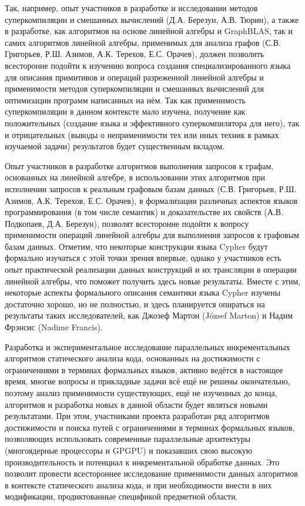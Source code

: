 \documentclass[12pt]{article}  %
\theoremstyle{remark}
\begin{document}
Так, например, опыт участников в разработке и исследовании методов суперкомпиляции и смешанных вычислений (Д.А. Березун, А.В. Тюрин), а также в разработке, как алгоритмов на основе линейной алгебры и GraphBLAS, так и самих алгоритмов линейной алгебры, применимых для анализа графов (С.В. Григорьев, Р.Ш. Азимов, А.К. Терехов, Е.С. Орачев), должен позволить всесторонне подойти к изучению вопроса создания специализированного языка для описания примитивов и операций разреженной линейной алгебры и применимости методов суперкомпиляции и смешанных вычислений для оптимизации программ написанных на нём. Так как применимость суперкомпиляции в данном контексте мало изучена, получение как положительных (создание языка и эффективного суперкомпилятора для него), так и отрицательных (выводы о неприменимости тех или иных техник  в рамках изучаемой задачи) результатов будет существенным вкладом.

Опыт участников в разработке алгоритмов выполнения запросов к графам, основанных на линейной алгебре, в использовании этих алгоритмов при исполнении запросов к реальным графовым базам данных (С.В. Григорьев, Р.Ш. Азимов, А.К. Терехов, Е.С. Орачев), в формализации различных аспектов языков программирования (в том числе семантик) и доказательстве их свойств (А.В. Подкопаев, Д.А. Березун), позволят всесторонне подойти к вопросу применимости операций линейной алгебры для выполнения запросов к графовым базам данных. Отметим, что некоторые конструкции языка Cypher будут формально изучаться с этой точки зрения впервые, однако у участников есть опыт практической реализации данных конструкций и их трансляции в операции линейной алгебры, что поможет получить здесь новые результаты. Вместе с этим, некоторые аспекты формального описания семантики языка Cypher изучены достаточно хорошо, но не полностью, и здесь планируется опираться на результаты таких исследователей, как Джозеф Мартон (József Marton) и Надим Фрэнсис (Nadime Francis).

Разработка и экспериментальное исследование параллельных инкрементальных алгоритмов статического анализа кода, основанных на достижимости с ограничениями в терминах формальных языков, активно ведётся в настоящее время, многие вопросы и прикладные задачи всё ещё не решены окончательно, поэтому анализ применимости существующих, ещё не изученных до конца, алгоритмов и разработка новых в данной области будет являться новыми результатами. При этом, участниками проекта разработан ряд алгоритмов достижимости и поиска путей с ограничениями в терминах формальных языков, позволяющих использовать современные параллельные архитектуры (многоядерные процессоры и GPGPU) и показавших свою высокую производительность и потенциал к инкрементальной обработке данных. Это позволит провести всестороннее исследование применимости данных алгоритмов в контексте статического анализа кода, и при необходимости внести в них модификации, продиктованные спецификой предметной области. 
\end{document}
